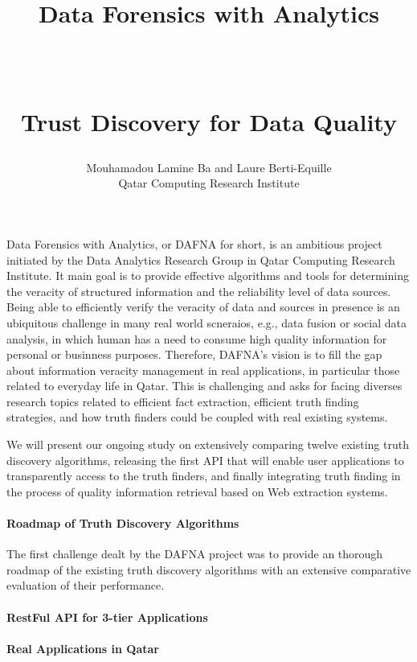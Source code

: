 \documentclass[paper=a4, fontsize=11pt]{scrartcl}	%
\title{ \vspace{-1in} 	\usefont{OT1}{bch}{b}{n}
		\huge \strut Data Forensics with Analytics\strut \\
		\Large \bfseries \strut Trust Discovery for Data Quality\strut
}
\author{ 									\usefont{OT1}{bch}{m}{n}
        Mouhamadou Lamine Ba and Laure Berti-Equille\\		\usefont{OT1}{bch}{m}{n}
        Qatar Computing Research Institute\\	\usefont{OT1}{bch}{m}{n}
}
\date{}
\numberwithin{equation}{section}															%
\numberwithin{figure}{section}																%
\numberwithin{table}{section}																%
\begin{document}
\maketitle
 
 Data Forensics with Analytics, or DAFNA for short, is an ambitious project initiated by the Data Analytics Research Group in Qatar Computing Research
 Institute. It main goal is to provide effective algorithms and tools for determining the veracity of structured information and the reliability level 
 of data sources. Being able to efficiently verify the veracity of data and sources in presence is an ubiquitous challenge in many real world scneraios,
 e.g., data fusion or social data analysis, in which human has a need to consume high quality information for personal or businness purposes. Therefore,
 DAFNA's vision is to fill the gap about information veracity management in real applications, in particular those related to everyday life in Qatar.
 This is challenging and asks for facing diverses research topics related to efficient fact
 extraction, efficient truth finding strategies, and how truth finders could be coupled with real existing systems.

 
 
 We will present our ongoing study on extensively comparing twelve existing truth discovery algorithms, releasing the first API that will 
 enable user applications to transparently access to the truth finders, and finally integrating truth finding in the process of quality information 
 retrieval based on Web extraction systems.
 
 \paragraph*{Roadmap of Truth Discovery Algorithms}The first challenge dealt by the DAFNA project was to provide an thorough roadmap of the existing 
 truth discovery algorithms with an extensive comparative evaluation of their performance.
 
 
 \paragraph*{RestFul API for 3-tier Applications}
 \paragraph*{Real Applications in Qatar}
\end{document}
